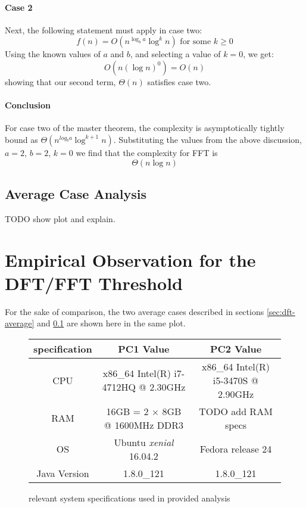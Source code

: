 \documentclass[]{article}
\begin{document}
\paragraph{Case 2}
Next, the following statement must apply in case two:
\[
f(n) = O(n^{\log_b{a}}\log^k{n}) \text{ for some } k \geq 0
\]
Using the known values of $a$ and $b$, and selecting a value of $k = 0$, we get:
\[
O(n(\log{n})^0) = O(n)
\]
showing that our second term, $\Theta(n)$ satisfies case two.

\paragraph{Conclusion}
For case two of the master theorem, the complexity is asymptotically tightly bound as $\Theta(n^{log_b{a}}\log^{k + 1}n)$. Substituting the values from the above discussion, $a = 2$, $b = 2$, $k = 0$ we find that the complexity for FFT is $$\Theta(n\log{n})$$

\subsection{Average Case Analysis}\label{sec:fft-average}
TODO show plot and explain.

\section{Empirical Observation for the DFT/FFT Threshold}\label{sec:threshold}
For the sake of comparison, the two average cases described in sections \ref{sec:dft-average} and \ref{sec:fft-average} are shown here in the same plot.
\begin{figure}[h]
	\begin{center}
		\begin{tabular}{ | c | c | c | }
			\hline
			specification & PC1 Value & PC2 Value \\
			\hline
			CPU & x86\_64 Intel(R) i7-4712HQ @ 2.30GHz & x86\_64 Intel(R) i5-3470S @ 2.90GHz\\
			\hline
			RAM & 16GB = 2 $\times$ 8GB @ 1600MHz DDR3 & TODO add RAM specs \\ 
			\hline
			OS & Ubuntu \emph{xenial} 16.04.2 & Fedora release 24\\
			\hline
			Java Version & 1.8.0\_121 & 1.8.0\_121\\
			\hline
		\end{tabular}
	\end{center}
	\caption{relevant system specifications used in provided analysis\label{fig:specs}}
\end{figure}
\nocite{*}



\end{document}
